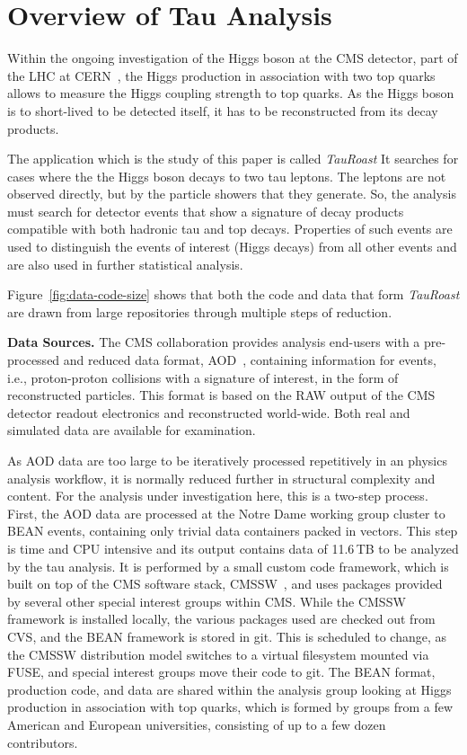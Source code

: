 \documentclass{sig-alternate}
\begin{document}
\section{Overview of Tau Analysis}

Within the ongoing investigation of the Higgs boson at the CMS
detector, part of the LHC at CERN~\cite{collaboration2008cms}, the Higgs production in association
with two top quarks allows to measure the Higgs coupling strength to
top quarks.  As the Higgs boson is to short-lived to be detected
itself, it has to be reconstructed from its decay products.

The application which is the study of this paper is called \emph{TauRoast}
It searches for cases where the the Higgs boson decays to two tau leptons.
The leptons are not observed directly, but by the particle showers
that they generate.  So, the analysis must search for detector
events that show a signature of decay products compatible with both hadronic tau and top decays.  Properties of such events are used to distinguish
the events of interest (Higgs decays) from all other events and
are also used in further statistical analysis.

Figure~\ref{fig:data-code-size} shows that both the code and data
that form \emph{TauRoast} are drawn from large repositories through
multiple steps of reduction.

{\bf Data Sources.}
The CMS collaboration provides analysis end-users with a pre-processed
and reduced data format, AOD~\cite{holtman2001cms}, containing information for events, i.e.,
proton-proton collisions with a signature of interest, in the form of
reconstructed particles.  This format is based on the RAW output of
the CMS detector readout electronics and reconstructed world-wide.
Both real and simulated data are available for examination.

As AOD data are too large to be iteratively processed repetitively in
an physics analysis workflow, it is normally reduced further in
structural complexity and content.  For the analysis under
investigation here, this is a two-step process.  First, the AOD data
are processed at the Notre Dame working group cluster to BEAN events,
containing only trivial data containers packed in vectors.  This step
is time and CPU intensive and its output contains data of 11.6$\,$TB to be
analyzed by the tau analysis.
It is performed by a small custom code framework,
which is built on top of the CMS software stack, CMSSW~\cite{cms2006cmssw},
and uses packages provided by several other special interest groups within CMS.
While the CMSSW framework is installed locally,
the various packages used are checked out from CVS,
and the BEAN framework is stored in git.
This is scheduled to change,
as the CMSSW distribution model switches to a virtual filesystem mounted via FUSE,
and special interest groups move their code to git.
The BEAN format, production code, and
data are shared within the analysis group looking at Higgs production
in association with top quarks, which is formed by groups from a few
American and European universities,
consisting of up to a few dozen contributors.
\end{document}
